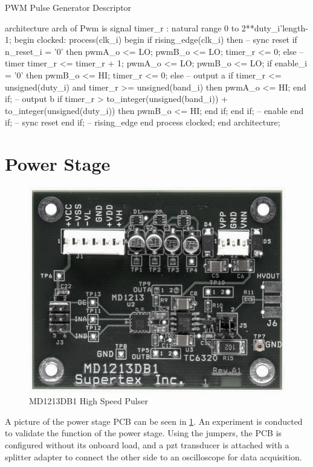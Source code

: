 \begin{listing}[htbp]
	\caption{PWM Pulse Generator Descriptor}
	\label{lst:4_controlsystem_pulser}
	\begin{mintedvhdl}
architecture arch of Pwm is
	signal timer_r       : natural range 0 to 2**duty_i'length-1;
	begin
		clocked: process(clk_i)
		begin
			if rising_edge(clk_i) then
			-- sync reset
			if n_reset_i = '0' then
				pwmA_o   <= LO;
				pwmB_o   <= LO;
				timer_r <= 0;
			else
			-- timer
				timer_r <= timer_r + 1;
				pwmA_o   <= LO;
				pwmB_o   <= LO;
				if enable_i = '0' then
					pwmB_o   <= HI;
					timer_r <= 0;
				else
					-- output a
					if timer_r <= unsigned(duty_i) and timer_r >= unsigned(band_i)  then
						pwmA_o <= HI;
					end if;
					-- output b
					if timer_r > to_integer(unsigned(band_i)) + to_integer(unsigned(duty_i)) then
						pwmB_o <= HI;
					end if;
				end if; -- enable
			end if; -- sync reset
		end if; -- rising_edge
	end process clocked;
end architecture;
	\end{mintedvhdl}
\end{listing}


\section{Power Stage}
\begin{figure}[htbp]
	\centering
	\includegraphics[width=.8\textwidth]{Figures/4_transmitter_pcb_pic.jpg}
	\caption{MD1213DB1 High Speed Pulser}
	\label{fig:4_transmitter_pcb_pic}
\end{figure}
A picture of the power stage PCB can be seen in \cref{fig:4_transmitter_pcb_pic}. An experiment is conducted to validate the function of the power stage. Using the jumpers, the PCB is configured without its onboard load, and a \gls{pzt} transducer is attached with a splitter adapter to connect the other side to an oscilloscope for data acquisition.


